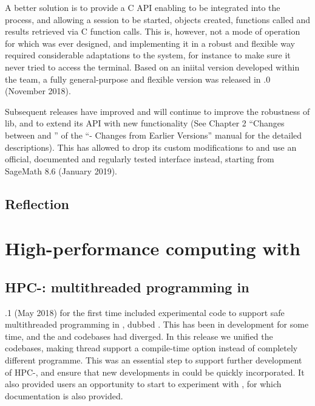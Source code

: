 \documentclass{deliverablereport}
\begin{document}
A better solution is to provide a C API enabling \GAP to be integrated
into the \Sage process, and allowing a \GAP session to be started,
objects created, functions called and results retrieved via C function
calls. This is, however, not a mode of operation for which \GAP was
ever designed, and implementing it in a robust and flexible way
required considerable adaptations to the system, for instance to make
sure it never tried to access the terminal. Based on an iniital
version developed within the \Sage team, a fully general-purpose and
flexible version was released in  .0 (November 2018).

Subsequent releases have improved and will continue to improve the
robustness of lib\GAP, and to extend its API with new functionality (See Chapter 2 
``Changes between  and '' of the 
``\GAP - Changes from Earlier Versions'' manual for the detailed
descriptions). This has allowed \Sage to drop its custom 
modifications to \GAP and use an official, documented and regularly 
tested \GAP interface instead, starting from SageMath 8.6 (January
2019).


\subsection{Reflection}\label{syntaxtree}

\section{High-performance computing with \GAP}\label{hpc}

\subsection{HPC-\GAP: multithreaded programming in \GAP}\label{hpc-gap}

.1 (May 2018) for the first time included experimental code to 
support safe multithreaded programming in \GAP, dubbed \HPCGAP. This
has been in development for some time, and the \HPCGAP and \GAP
codebases had diverged. In this release we unified the codebases,
making thread support a compile-time option instead of completely
different programme. This was an essential step to support further development of 
HPC-\GAP, and ensure that new developments in \GAP could be quickly
incorporated.
It also provided users an opportunity to start to experiment 
with \HPCGAP, for which documentation is also provided.
\end{document}
